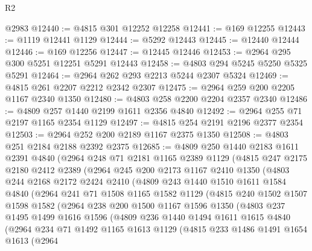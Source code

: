 \begin{lexlean}{R2}
\begin{coremodule}
    @2983
@12440 := @4815 @301 @12252 @12258
@12441 := @169 @12255
@12443 := @1119 @12441 @1129
@12444 := @5292 @12443
@12445 := @12440 @12444
@12446 := @169 @12256
@12447 := @12445 @12446
@12453 := @2964 @295 @300 @5251 @12251 @5291 @12443
@12458 := @4803 @294 @5245 @5250 @5325 @5291
@12464 := @2964 @262 @293 @2213 @5244 @2307 @5324
@12469 := @4815 @261 @2207 @2212 @2342 @2307
@12475 := @2964 @259 @200 @2205 @1167 @2340 @1350
@12480 := @4803 @258 @2200 @2204 @2357 @2340
@12486 := @4809 @257 @1440 @2199 @1611 @2356 @4840
@12492 := @2964 @255 @71 @2197 @1165 @2354 @1129
@12497 := @4815 @254 @2191 @2196 @2377 @2354
@12503 := @2964 @252 @200 @2189 @1167 @2375 @1350
@12508 := @4803 @251 @2184 @2188 @2392 @2375
@12685 := @4809
    @250
    @1440
    @2183
    @1611
    @2391
    @4840
    (@2964
      @248
      @71
      @2181
      @1165
      @2389
      @1129
      (@4815
        @247
        @2175
        @2180
        @2412
        @2389
        (@2964
          @245
          @200
          @2173
          @1167
          @2410
          @1350
          (@4803
            @244
            @2168
            @2172
            @2424
            @2410
            (@4809
              @243
              @1440
              @1510
              @1611
              @1584
              @4840
              (@2964
                @241
                @71
                @1508
                @1165
                @1582
                @1129
                (@4815
                  @240
                  @1502
                  @1507
                  @1598
                  @1582
                  (@2964
                    @238
                    @200
                    @1500
                    @1167
                    @1596
                    @1350
                    (@4803
                      @237
                      @1495
                      @1499
                      @1616
                      @1596
                      (@4809
                        @236
                        @1440
                        @1494
                        @1611
                        @1615
                        @4840
                        (@2964
                          @234
                          @71
                          @1492
                          @1165
                          @1613
                          @1129
                          (@4815
                            @233
                            @1486
                            @1491
                            @1654
                            @1613
                            (@2964

\end{coremodule}
\end{lexlean}

